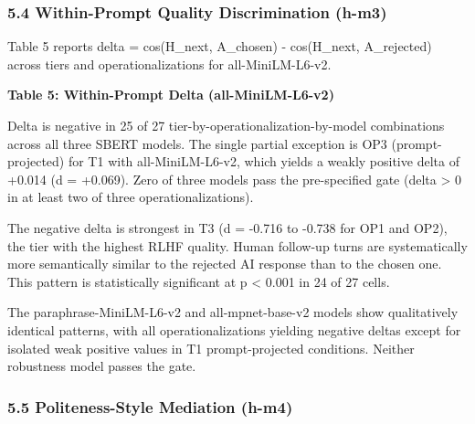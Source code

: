 \subsubsection{5.4 Within-Prompt Quality Discrimination (h-m3)}

Table 5 reports delta = cos(H\_next, A\_chosen) - cos(H\_next, A\_rejected) across tiers and operationalizations for all-MiniLM-L6-v2.

\textbf{Table 5: Within-Prompt Delta (all-MiniLM-L6-v2)}

\begin{table}[htbp]
\centering
{}
\end{table}

Delta is negative in 25 of 27 tier-by-operationalization-by-model combinations across all three SBERT models. The single partial exception is OP3 (prompt-projected) for T1 with all-MiniLM-L6-v2, which yields a weakly positive delta of +0.014 (d = +0.069). Zero of three models pass the pre-specified gate (delta > 0 in at least two of three operationalizations).

The negative delta is strongest in T3 (d = -0.716 to -0.738 for OP1 and OP2), the tier with the highest RLHF quality. Human follow-up turns are systematically more semantically similar to the rejected AI response than to the chosen one. This pattern is statistically significant at p < 0.001 in 24 of 27 cells.

The paraphrase-MiniLM-L6-v2 and all-mpnet-base-v2 models show qualitatively identical patterns, with all operationalizations yielding negative deltas except for isolated weak positive values in T1 prompt-projected conditions. Neither robustness model passes the gate.

\subsubsection{5.5 Politeness-Style Mediation (h-m4)}

